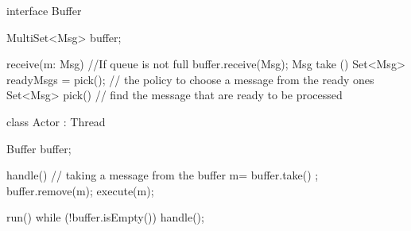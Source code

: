 interface Buffer {
    MultiSet<Msg> buffer; 

    receive(m: Msg) {
        //If queue is not full
        buffer.receive(Msg);
    }
    Msg take ()
    {
        Set<Msg> readyMsgs = pick();
        // the policy to choose a message from the ready ones
    }
    Set<Msg> pick() {
        // find the message that are ready to be processed
    }

}

class Actor : Thread {
    Buffer buffer;
    
    handle()
    {
      // taking a message from the buffer
        m= buffer.take() ;
        buffer.remove(m);
        execute(m);
    }

     run() {
        while (!buffer.isEmpty()) {
            handle();
        }
    }   
}
